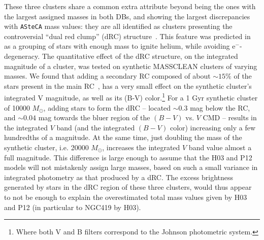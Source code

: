 \documentclass[draft]{aa}
\begin{document}
These three clusters share a common extra attribute beyond being the ones with
the largest assigned masses in both DBs, and showing the largest discrepancies
with \texttt{ASteCA} mass values: they are all identified as clusters
presenting the controversial ``dual red clump'' (dRC)
structure~\citep{Girardi_2009}.
This feature was predicted in~\cite{Girardi_1998} as a grouping of stars with
enough mass to ignite helium, while avoiding e$^-$-degeneracy.
%
%
%
The quantitative effect of the dRC structure, on the integrated magnitude of a
cluster, was tested on synthetic MASSCLEAN clusters of varying masses. We found
that adding a secondary RC composed of about ${\sim}15\%$ of the stars present
in the main RC~\citep[the approximate value found for NGC419 in][]
{Girardi_2009}, has a very small effect on the synthetic cluster's integrated V
magnitude, as well as its (B-V) color.\footnote{Where both V and B filters
correspond to the Johnson photometric system.}
%
For a 1 Gyr synthetic cluster of 10000 $M_{\odot}$, adding stars
to form the dRC -- located ${\sim}0.3$ mag below the RC, and
${\sim}0.04$ mag towards the bluer region of the $(B-V)$ vs. $V$ CMD -- results
in the integrated $V$ band (and the integrated $(B-V)$ color) increasing only
a few hundredths of a magnitude.
At the same time, just doubling the mass of the synthetic cluster, i.e.
20000 $M_{\odot}$, increases the integrated $V$ band value almost a full
magnitude. This difference is large enough to assume that the H03 and P12
models will not mistakenly assign large masses, based on such a small variance
in integrated photometry as that produced by a dRC.\@
%
The excess brightness generated by stars in the dRC region of these three
clusters, would thus appear to not be enough to explain the overestimated total
mass values given by H03 and P12 (in particular to NGC419 by H03).
\end{document}
